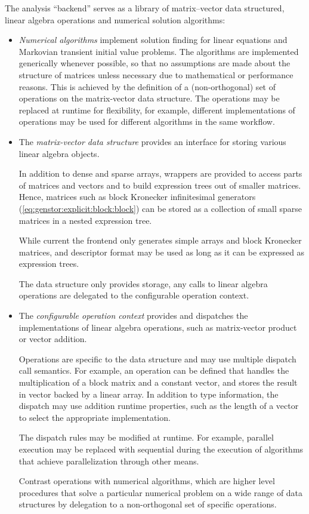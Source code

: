 The analysis ``backend'' serves as a library of matrix--vector data
structured, linear algebra operations and numerical solution
algorithms:
\begin{itemize}
\item \emph{Numerical algorithms} implement solution finding for linear
  equations and Markovian transient initial value problems. The
  algorithms are implemented generically whenever possible, so that no
  assumptions are made about the structure of matrices unless
  necessary due to mathematical or performance reasons. This is
  achieved by the definition of a (non-orthogonal) set of operations
  on the matrix-vector data structure. The operations may be replaced
  at runtime for flexibility, for example, different implementations
  of operations may be used for different algorithms in the same
  workflow.

\item The \emph{matrix-vector data structure} provides an interface
  for storing various linear algebra objects.

  In addition to dense and sparse arrays, wrappers are provided to
  access parts of matrices and vectors and to build expression trees
  out of smaller matrices. Hence, matrices such as block Kronecker
  infinitesimal generators (\vref{eq:genstor:explicit:block:block})
  can be stored as a collection of small sparse matrices in a nested
  expression tree.

  While current the frontend only generates simple arrays and block
  Kronecker matrices, and descriptor format may be used as long as it
  can be expressed as expression trees.

  The data structure only provides storage, any calls to linear
  algebra operations are delegated to the configurable operation
  context.

\item The \emph{configurable operation context} provides and
  dispatches the implementations of linear algebra operations, such as
  matrix-vector product or vector addition.

  Operations are specific to the data structure and may use multiple
  dispatch call semantics. For example, an operation can be defined
  that handles the multiplication of a block matrix and a constant
  vector, and stores the result in vector backed by a linear
  array. In addition to type information, the dispatch may use
  addition runtime properties, such as the length of a vector to
  select the appropriate implementation.

  The dispatch rules may be modified at runtime. For example, parallel
  execution may be replaced with sequential during the execution of
  algorithms that achieve parallelization through other means.

  Contrast operations with numerical algorithms, which are higher level
  procedures that solve a particular numerical problem on a wide range
  of data structures by delegation to a non-orthogonal set of specific
  operations.
\end{itemize}

